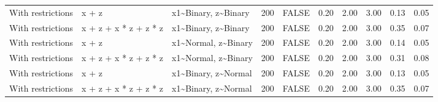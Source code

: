 \begin{longtable}{lllrlrrrrr}
  With restrictions & x + z & x1\~{}Binary, z\~{}Binary & 200 & FALSE & 0.20 & 2.00 & 3.00 & 0.13 & 0.05 \\ 
  With restrictions & x + z + x * z + z * z & x1\~{}Binary, z\~{}Binary & 200 & FALSE & 0.20 & 2.00 & 3.00 & 0.35 & 0.07 \\ 
  With restrictions & x + z & x1\~{}Normal, z\~{}Binary & 200 & FALSE & 0.20 & 2.00 & 3.00 & 0.14 & 0.05 \\ 
  With restrictions & x + z + x * z + z * z & x1\~{}Normal, z\~{}Binary & 200 & FALSE & 0.20 & 2.00 & 3.00 & 0.31 & 0.08 \\ 
  With restrictions & x + z & x1\~{}Binary, z\~{}Normal & 200 & FALSE & 0.20 & 2.00 & 3.00 & 0.13 & 0.05 \\ 
  With restrictions & x + z + x * z + z * z & x1\~{}Binary, z\~{}Normal & 200 & FALSE & 0.20 & 2.00 & 3.00 & 0.35 & 0.07 \\ 
   \hline
\hline
\end{longtable}
